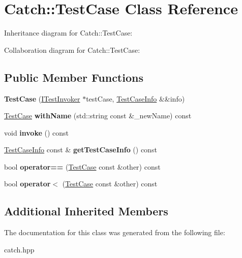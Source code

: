 \hypertarget{classCatch_1_1TestCase}{}\section{Catch\+:\+:Test\+Case Class Reference}
\label{classCatch_1_1TestCase}


Inheritance diagram for Catch\+:\+:Test\+Case\+:


Collaboration diagram for Catch\+:\+:Test\+Case\+:
\subsection*{Public Member Functions}
\begin{DoxyCompactItemize}
\item 
{\bfseries Test\+Case} (\hyperlink{structCatch_1_1ITestInvoker}{I\+Test\+Invoker} $\ast$test\+Case, \hyperlink{structCatch_1_1TestCaseInfo}{Test\+Case\+Info} \&\&info)\hypertarget{classCatch_1_1TestCase_aae5709fc1cb68e19ab0ac27e1ffd6a76}{}\label{classCatch_1_1TestCase_aae5709fc1cb68e19ab0ac27e1ffd6a76}

\item 
\hyperlink{classCatch_1_1TestCase}{Test\+Case} {\bfseries with\+Name} (std\+::string const \&\+\_\+new\+Name) const \hypertarget{classCatch_1_1TestCase_ab6dbc6c82b7c1680013c67bdedccfc8e}{}\label{classCatch_1_1TestCase_ab6dbc6c82b7c1680013c67bdedccfc8e}

\item 
void {\bfseries invoke} () const \hypertarget{classCatch_1_1TestCase_aac2e028135cc88c3e3aac04650960a6c}{}\label{classCatch_1_1TestCase_aac2e028135cc88c3e3aac04650960a6c}

\item 
\hyperlink{structCatch_1_1TestCaseInfo}{Test\+Case\+Info} const \& {\bfseries get\+Test\+Case\+Info} () const \hypertarget{classCatch_1_1TestCase_a25c03661ab092431cdff10df5c58a5a7}{}\label{classCatch_1_1TestCase_a25c03661ab092431cdff10df5c58a5a7}

\item 
bool {\bfseries operator==} (\hyperlink{classCatch_1_1TestCase}{Test\+Case} const \&other) const \hypertarget{classCatch_1_1TestCase_a40eab521b316c7d476f6b4dd1c33eec8}{}\label{classCatch_1_1TestCase_a40eab521b316c7d476f6b4dd1c33eec8}

\item 
bool {\bfseries operator$<$} (\hyperlink{classCatch_1_1TestCase}{Test\+Case} const \&other) const \hypertarget{classCatch_1_1TestCase_aa5174e85e3aac6e7398dee9c76730324}{}\label{classCatch_1_1TestCase_aa5174e85e3aac6e7398dee9c76730324}

\end{DoxyCompactItemize}
\subsection*{Additional Inherited Members}


The documentation for this class was generated from the following file\+:\begin{DoxyCompactItemize}
\item 
catch.\+hpp\end{DoxyCompactItemize}
